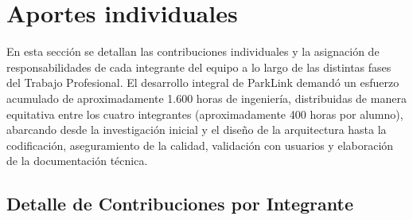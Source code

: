 \section{Aportes individuales}\label{sec:aportes}

En esta sección se detallan las contribuciones individuales y la asignación de responsabilidades de cada integrante del equipo a lo largo de las distintas fases del Trabajo Profesional. El desarrollo integral de ParkLink demandó un esfuerzo acumulado de aproximadamente 1.600 horas de ingeniería, distribuidas de manera equitativa entre los cuatro integrantes (aproximadamente 400 horas por alumno), abarcando desde la investigación inicial y el diseño de la arquitectura hasta la codificación, aseguramiento de la calidad, validación con usuarios y elaboración de la documentación técnica.

\subsection{Detalle de Contribuciones por Integrante}

